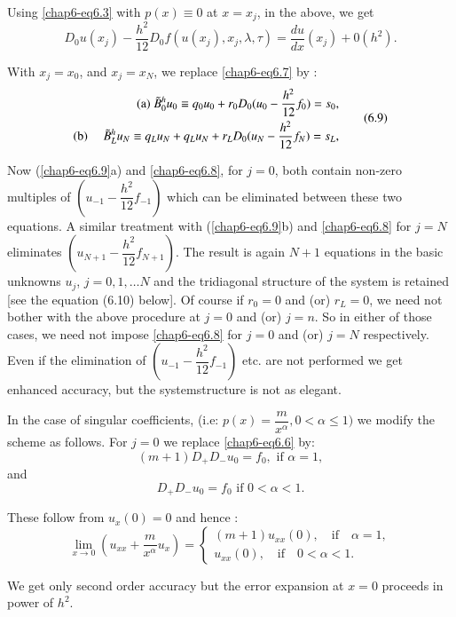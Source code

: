 Using \eqref{chap6-eq6.3} with $p(x) \equiv 0$ at $x = x_j$, in the
above, we get 
$$
D_0 u(x_j) - \frac{h^2}{12} D_0 f(u(x_j),x_j,\lambda,\tau) =
\frac{du}{dx}(x_j) + 0(h^2). 
$$

With $x_j = x_0$, and $x_j = x_N$, we replace \eqref{chap6-eq6.7} by : 
\begin{equation*}
\begin{split}
{\rm  (a)}~ \tilde{B}_0^h u_0 \equiv q_0 u_0 + r_0 D_0 (u_0 -
  \frac{h^2}{12} f_0) = s_0,\\ 
{\rm (b)}~ \quad \tilde{B}_L^h u_N \equiv q_L u_N + q_L u_N + r_L D_0 (u_N
  - \frac{h^2}{12} f_N) = s_L,
\end{split}\tag{6.9} \label{chap6-eq6.9}
\end{equation*}

Now (\ref{chap6-eq6.9}a) and \eqref{chap6-eq6.8}, for $j = 0$, both
contain non-zero multiples 
of $(u_{-1}-\dfrac{h^2}{12} f_{-1})$ which can be eliminated between
these two equations. A similar treatment with (\ref{chap6-eq6.9}b) and
\eqref{chap6-eq6.8} for
$j = N$ eliminates $(u_{N+1} - \dfrac{h^2}{12}f_{N+1})$. The result is
again $N+1$ equations in the basic unknowns $u_j$, $j = 0,1,\ldots N$ and
the tridiagonal structure of the system is retained [see the equation
  (6.10) below]. Of course if $r_0 = 0$ and (or) $r_L =
0$, we need 
not bother with the above procedure at $j = 0$ and (or) $j = n$. So in
either of those cases, we need not impose \eqref{chap6-eq6.8} for $j
=0$ and (or) $j = N$ respectively. Even if the elimination of $(u_{-1} -
\dfrac{h^2}{12}f_{-1})$ etc. are not performed we get enhanced
accuracy, but the system\pageoriginale structure is not as elegant. 

In the case of singular coefficients, (i.e: $p(x)
=\dfrac{m}{x^{\alpha}}, 0<\alpha \leq 1)$ we modify the scheme as
follows. For $j = 0 $ we replace \eqref{chap6-eq6.6} by:  
$$
(m+1) D_+ D_- u_0 = f_0, \text{ if } \alpha = 1,  
$$
and  
$$
D_+D_- u_0 = f_0 \text{ if } 0< \alpha < 1.
$$

These follow from $u_x(0) = 0$ and hence : 
\begin{equation*}
\lim_{x\rightarrow 0} (u_{xx} + \frac{m}{x^\alpha} u_x) =
\begin{cases}
(m+1)u_{xx}(0), \quad \text{if} \quad \alpha = 1,\\
u_{xx}(0), \quad \text{if} \quad  0 < \alpha < 1.
\end{cases}
\end{equation*}

We get only second order accuracy but the error expansion at $x=0$
proceeds in power of $h^2$. 

